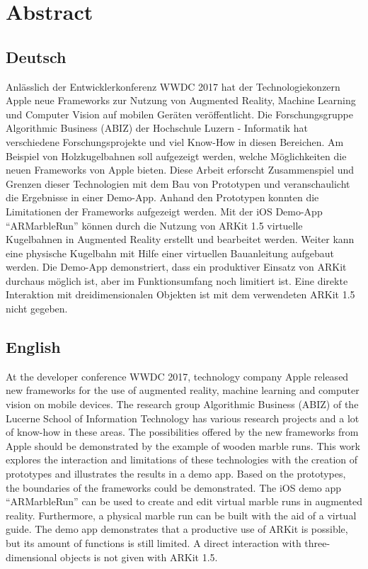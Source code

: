\section*{Abstract}

\subsection*{Deutsch}

Anlässlich der Entwicklerkonferenz WWDC 2017 hat der Technologiekonzern Apple neue Frameworks zur Nutzung von Augmented Reality, Machine Learning und Computer Vision auf mobilen Geräten veröffentlicht.
Die Forschungsgruppe Algorithmic Business (ABIZ) der Hochschule Luzern - Informatik hat verschiedene Forschungsprojekte und viel Know-How in diesen Bereichen.
Am Beispiel von Holzkugelbahnen soll aufgezeigt werden, welche Möglichkeiten die neuen Frameworks von Apple bieten.
Diese Arbeit erforscht Zusammenspiel und Grenzen dieser Technologien mit dem Bau von Prototypen und veranschaulicht die Ergebnisse in einer Demo-App. 
Anhand den Prototypen konnten die Limitationen der Frameworks aufgezeigt werden.
Mit der iOS Demo-App "`ARMarbleRun"' können durch die Nutzung von ARKit 1.5 virtuelle Kugelbahnen in Augmented Reality erstellt und bearbeitet werden.
Weiter kann eine physische Kugelbahn mit Hilfe einer virtuellen Bauanleitung aufgebaut werden.
Die Demo-App demonstriert, dass ein produktiver Einsatz von ARKit durchaus möglich ist, aber im Funktionsumfang noch limitiert ist.
Eine direkte Interaktion mit dreidimensionalen Objekten ist mit dem verwendeten ARKit 1.5 nicht gegeben.

\subsection*{English}

At the developer conference WWDC 2017, technology company Apple released new frameworks for the use of augmented reality, machine learning and computer vision on mobile devices.
The research group Algorithmic Business (ABIZ) of the Lucerne School of Information Technology has various research projects and a lot of know-how in these areas.
The possibilities offered by the new frameworks from Apple should be demonstrated by the example of wooden marble runs.
This work explores the interaction and limitations of these technologies with the creation of prototypes and illustrates the results in a demo app.
Based on the prototypes, the boundaries of the frameworks could be demonstrated.
The iOS demo app ``ARMarbleRun'' can be used to create and edit virtual marble runs in augmented reality.
Furthermore, a physical marble run can be built with the aid of a virtual guide.
The demo app demonstrates that a productive use of ARKit is possible, but its amount of functions is still limited.
A direct interaction with three-dimensional objects is not given with ARKit 1.5.
